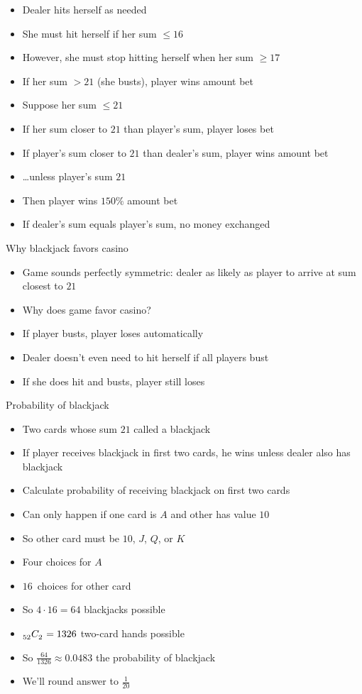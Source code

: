 \documentclass[handout]{beamer}
\theoremstyle{definition}
\newcommand\ncr[2]{\tensor[_{#1}]C{_{#2}}}
\begin{document}
\begin{frame}
\begin{itemize}
\item Dealer hits herself as needed
\item She \alert{must} hit herself if her sum $\le 16$
\item However, she must stop hitting herself when her sum $\ge 17$
\item If her sum $>21$ (she \alert{busts}), player wins amount bet
\item Suppose her sum $\le 21$
\item If her sum closer to $21$ than player's sum,
player loses bet
\item If player's sum closer to $21$ than dealer's sum,
player wins amount bet
\item \dots unless player's sum $21$
\item Then player wins $150\%$ amount bet
\item If dealer's sum equals player's sum, no money exchanged
\end{itemize}
\end{frame}

\begin{frame}{Why blackjack favors casino}
\begin{itemize}
\item Game sounds perfectly symmetric: dealer as likely
as player to arrive at sum closest to $21$
\item Why does game favor casino?
\item If player busts, player loses automatically
\item Dealer doesn't even need to hit herself if all
players bust
\item If she does hit and busts, player still loses
\end{itemize}
\end{frame}

\begin{frame}{Probability of blackjack}
\begin{itemize}
\item Two cards whose sum $21$ called a \alert{blackjack}
\item If player receives blackjack in first two cards,
he wins unless dealer also has blackjack
\item Calculate probability of receiving blackjack on first two cards
\item Can only happen if one card is $A$ and other
has value $10$
\item So other card must be $10$, $J$, $Q$, or $K$
\item Four choices for $A$
\item $16$~choices for other card
\item So $4\cdot 16=64$ blackjacks possible
\item $\ncr{52}{2}=1326$ two-card hands possible 
\item So $\frac{64}{1326}\approx 0.0483$ the probability of blackjack
\item We'll round answer to $\frac{1}{20}$
\end{itemize}
\end{frame}
\end{document}
